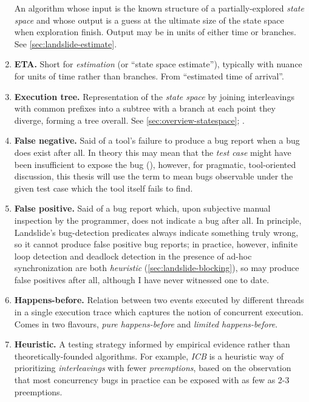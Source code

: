 \begin{enumerate}
		An algorithm whose input is the known structure of a partially-explored {\em state space}
		and whose output is a guess at the ultimate size of the state space when exploration finish. %
		Output may be in units of either time or branches.
		See \cref{sec:landslide-estimate}.
	\item {\bf ETA.}
		Short for {\em estimation} (or ``state space estimate''),
		typically with nuance for units of time rather than branches.
		From ``estimated time of arrival''.
	\item {\bf Execution tree.}
		Representation of the {\em state space} by joining interleavings with common prefixes
		into a subtree with a branch at each point they diverge, forming a tree overall.
		See \cref{sec:overview-statespace}; .
	\item {\bf False negative.}
		Said of a tool's failure to produce a bug report when a bug does exist after all.
		In theory this may mean that the {\em test case} might have been insufficient to expose the bug
		(),
		however, for pragmatic, tool-oriented discussion,
		this thesis will use the term to mean bugs observable under the given test case which the tool itself fails to find.
	\item {\bf False positive.}
		Said of a bug report which,
		upon subjective manual inspection by the programmer,
		does not indicate a bug after all.
		In principle, Landslide's bug-detection predicates always indicate something truly wrong,
		so it cannot produce false positive bug reports;
		in practice, however, infinite loop detection and deadlock detection in the presence of ad-hoc synchronization
		are both {\em heuristic} (\cref{sec:landslide-blocking}),
		so may produce false positives after all, although I have never witnessed one to date.
	\item {\bf Happens-before.}
		Relation between two events executed by different threads in a single execution trace
		which captures the notion of concurrent execution.
		Comes in two flavours, {\em pure happens-before} and {\em limited happens-before}.
	\item {\bf Heuristic.}
		A testing strategy informed by empirical evidence rather than theoretically-founded algorithms.
		For example, {\em ICB} is a heuristic way of prioritizing {\em interleavings} with fewer {\em preemptions},
		based on the observation that most concurrency bugs in practice can be exposed with as few as 2-3 preemptions.

\end{enumerate}
